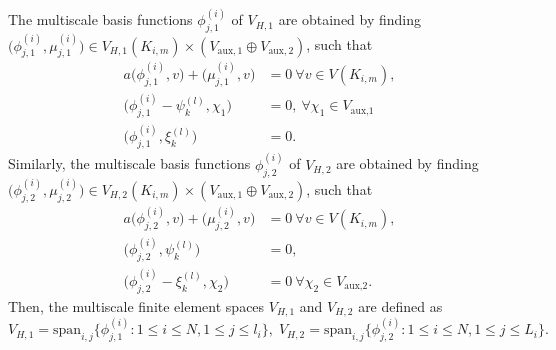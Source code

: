 \documentclass[preprint,12pt]{elsarticle}
\newtheorem{remark}{Remark}
\newcommand{\sff}[1]{{\color{orange}{#1}}}
\begin{document}
The multiscale basis functions $\phi_{j,1}^{(i)}$ of $V_{H,1}$ are obtained by finding $\Big(\phi_{j,1}^{(i)},\mu_{j,1}^{(i)}\Big)\in V_{H,1}(K_{i,m})\times (V_{\text{aux},1}\oplus 
 V_{\text{aux},2})$, such that
\begin{equation}\label{eq0}
\begin{aligned}
a\Big(\phi_{j,1}^{(i)},v\Big)+\Big(\mu_{j,1}^{(i)},v\Big)&=0~\forall v\in V(K_{i,m}),\\
\Big(\phi_{j,1}^{(i)}-\psi_k^{(l)},\chi_1\Big)&=0,~\forall\chi_1\in V_{\text{aux,1}}\\
\Big(\phi_{j,1}^{(i)},\xi_k^{(l)}\Big)&=0.
\end{aligned}
\end{equation}
Similarly, the multiscale basis functions $\phi_{j,2}^{(i)}$ of $V_{H,2}$ are obtained by finding 
$\Big(\phi_{j,2}^{(i)},\mu_{j,2}^{(i)}\Big)\in V_{H,2}(K_{i,m})\times (V_{\text{aux},1}\oplus V_{\text{aux},2})$, such that
\begin{equation}\label{eq1}
\begin{aligned}
    a\Big(\phi_{j,2}^{(i)},v\Big)+\Big(\mu_{j,2}^{(i)},v\Big)&=0~\forall v\in V(K_{i,m}),\\
    \Big(\phi_{j,2}^{(i)},\psi_k^{(l)}\Big)&=0,\\
    \Big(\phi_{j,2}^{(i)}-\xi_k^{(l)},\chi_2\Big)&=0~\forall \chi_2\in V_{\text{aux,2}}.
\end{aligned}
\end{equation}
Then, the multiscale finite element spaces $V_{H,1}$ and $V_{H,2}$ are defined as
$$V_{H,1}=\text{span}_{i,j}\Big\{\phi_{j,1}^{(i)}:1\leq i\leq N,1\leq j\leq l_i\Big\},\;V_{H,2}=\text{span}_{i,j}\Big\{\phi_{j,2}^{(i)}:1\leq i\leq N,1\leq j\leq L_i\Big\}.$$
\end{document}
